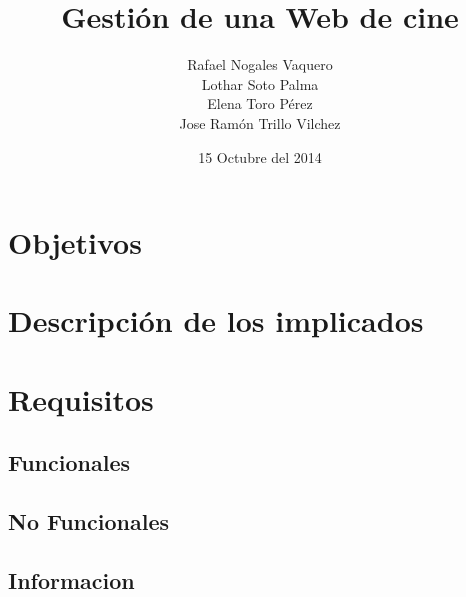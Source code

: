 \documentclass{article}
\title{Gestión de una Web de cine}
\author{Rafael Nogales Vaquero
\\Lothar Soto Palma
\\Elena Toro Pérez
\\Jose Ramón Trillo Vilchez}
\date{15 Octubre del 2014}
\begin{document}
\maketitle

\section{Objetivos}
\section{Descripción de los implicados}
\section{Requisitos}
    \subsection{Funcionales}
    \subsection{No Funcionales}
    \subsection{Informacion}
\end{document}
